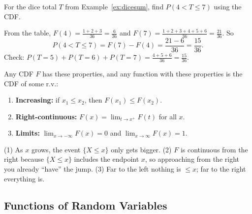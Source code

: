 \bigskip

\begin{example}
For the dice total $T$ from Example~\ref{ex:dicesum}, find $P(4 < T \le 7)$ using the CDF.
\end{example}

\medskip

\begin{solution}
From the table, $F(4) = \tfrac{1 + 2 + 3}{36} = \tfrac{6}{36}$ and $F(7) = \tfrac{1 + 2 + 3 + 4 + 5 + 6}{36} = \tfrac{21}{36}$. So
\medskip
\[
P(4 < T \le 7) = F(7) - F(4) = \frac{21 - 6}{36} = \frac{15}{36}.
\]
\medskip
Check: $P(T = 5) + P(T = 6) + P(T = 7) = \tfrac{4 + 5 + 6}{36} = \tfrac{15}{36}$.
\end{solution}

\bigskip

\begin{theorem}\label{thm:validcdf}
Any CDF $F$ has these properties, and any function with these properties is the CDF of some r.v.:
\medskip
\begin{enumerate}
  \setlength{\itemsep}{0.4em}
  \item \textbf{Increasing:} if $x_1 \le x_2$, then $F(x_1) \le F(x_2)$.
  \item \textbf{Right-continuous:} $F(x) = \displaystyle\lim_{t \to x^+} F(t)$ for all $x$.
  \item \textbf{Limits:} $\displaystyle\lim_{x \to -\infty} F(x) = 0$ and $\displaystyle\lim_{x \to \infty} F(x) = 1$.
\end{enumerate}
\end{theorem}

\bigskip

\begin{intuition}
(1) As $x$ grows, the event $\{X \le x\}$ only gets bigger. (2) $F$ is continuous from the right because $\{X \le x\}$ includes the endpoint $x$, so approaching from the right you already ``have'' the jump. (3) Far to the left nothing is $\le x$; far to the right everything is.
\end{intuition}

\bigskip

\subsection{Functions of Random Variables}

